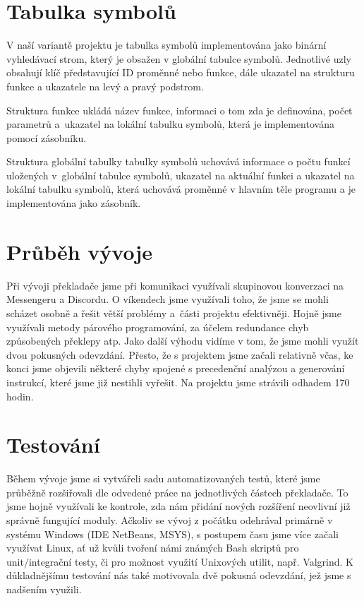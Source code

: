 \documentclass[12pt, a4paper]{article}
\begin{document}
\section{Tabulka symbolů}
V naší variantě projektu je tabulka symbolů implementována jako binární vyhledávací strom, který je obsažen v globální tabulce symbolů. Jednotlivé uzly obsahují klíč představující ID proměnné nebo funkce, dále ukazatel na strukturu funkce a ukazatele na levý a pravý podstrom. \par

Struktura funkce ukládá název funkce, informaci o tom zda je definována, počet parametrů a~ukazatel na lokální tabulku symbolů, která je implementována pomocí zásobníku. \par

Struktura globální tabulky tabulky symbolů uchovává informace o počtu funkcí uložených v~globální tabulce symbolů, ukazatel na aktuální funkci a ukazatel na lokální tabulku symbolů, která uchovává proměnné v hlavním těle programu a je implementována jako zásobník. \par



\section{Průběh vývoje}
Při vývoji překladače jsme při komunikaci využívali skupinovou konverzaci na Messengeru a Discordu. O víkendech jsme využívali toho, že jsme se mohli scházet osobně a řešit větší problémy a~části projektu efektivněji. Hojně jsme využívali metody párového programování, za účelem redundance chyb způsobených překlepy atp. Jako další výhodu vidíme v tom, že jsme mohli využít dvou pokusných odevzdání. Přesto, že s projektem jsme začali relativně včas, ke konci jsme objevili některé chyby spojené s precedenční analýzou a generování instrukcí, které jsme již nestihli vyřešit. Na projektu jsme strávili odhadem 170 hodin. \par

\section{Testování}

Během vývoje jsme si vytvářeli sadu automatizovaných testů, které jsme průběžně rozšiřovali dle odvedené práce na jednotlivých částech překladače. To jsme hojně využívali ke kontrole, zda nám přidání nových rozšíření neovlivní již správně fungující moduly. Ačkoliv se vývoj z počátku odehrával primárně v systému Windows (IDE NetBeans, MSYS), s postupem času jsme více začali využívat Linux, ať už kvůli tvoření námi známých Bash skriptů pro unit/integrační testy, či pro možnost využití Unixových utilit, např. Valgrind. K důkladnějšímu testování nás také motivovala dvě pokusná odevzdání, jež jsme s nadšením využili. \par
\end{document}
